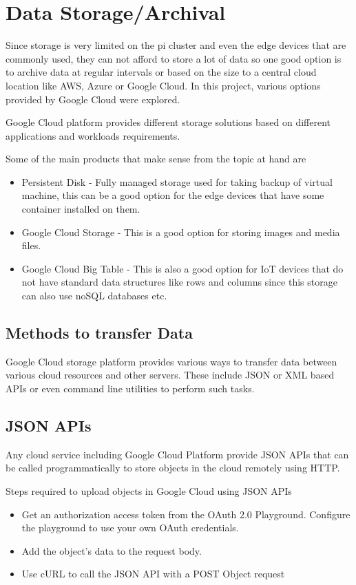 \section{Data Storage/Archival}

Since storage is very limited on the pi cluster and even the edge
devices that are commonly used, they can not afford to store a lot of
data so one good option is to archive data at regular intervals or
based on the size to a central cloud location like AWS, Azure or
Google Cloud. In this project, various options provided by Google
Cloud were explored.

Google Cloud platform provides different storage solutions based on
different applications and workloads requirements.

Some of the main products that make sense from the topic at hand are

\begin{itemize}
\item Persistent Disk - Fully managed storage used for taking backup
  of virtual machine, this can be a good option for the edge devices
  that have some container installed on them.
\item Google Cloud Storage - This is a good option for storing images
  and media files.
\item Google Cloud Big Table - This is also a good option for IoT
  devices that do not have standard data structures like rows and
  columns since this storage can also use noSQL databases etc.
\end{itemize} 

\subsection{Methods to transfer Data}

Google Cloud storage platform provides various ways to transfer data
between various cloud resources and other servers. These include JSON
or XML based APIs or even command line utilities to perform such tasks.

\subsection{JSON APIs}

Any cloud service including Google Cloud Platform provide JSON APIs
that can be called programmatically to store objects in the cloud
remotely using HTTP.

Steps required to upload objects in Google Cloud using JSON APIs
\begin{itemize}
\item Get an authorization access token from the OAuth 2.0
  Playground. Configure the playground to use your own OAuth
  credentials.
\item Add the object's data to the request body.
\item Use cURL to call the JSON API with a POST Object request
\end{itemize} 

